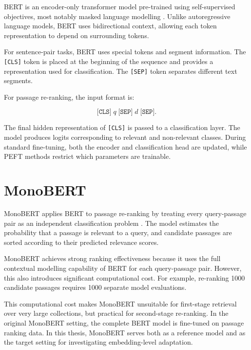 BERT is an encoder-only transformer model pre-trained using self-supervised objectives, most notably masked language modelling \cite{devlin2018bert}. Unlike autoregressive language models, BERT uses bidirectional context, allowing each token representation to depend on surrounding tokens.

For sentence-pair tasks, BERT uses special tokens and segment information. The \texttt{[CLS]} token is placed at the beginning of the sequence and provides a representation used for classification. The \texttt{[SEP]} token separates different text segments.

For passage re-ranking, the input format is:

\begin{equation}
    \texttt{[CLS]} \; q \; \texttt{[SEP]} \; d \; \texttt{[SEP]}.
\end{equation}

The final hidden representation of \texttt{[CLS]} is passed to a classification layer. The model produces logits corresponding to relevant and non-relevant classes. During standard fine-tuning, both the encoder and classification head are updated, while PEFT methods restrict which parameters are trainable.

\section{MonoBERT}
\label{sec:background_monobert}

MonoBERT applies BERT to passage re-ranking by treating every query-passage pair as an independent classification problem \cite{nogueira2019passage}. The model estimates the probability that a passage is relevant to a query, and candidate passages are sorted according to their predicted relevance scores.

MonoBERT achieves strong ranking effectiveness because it uses the full contextual modelling capability of BERT for each query-passage pair. However, this also introduces significant computational cost. For example, re-ranking 1000 candidate passages requires 1000 separate model evaluations.

This computational cost makes MonoBERT unsuitable for first-stage retrieval over very large collections, but practical for second-stage re-ranking. In the original MonoBERT setting, the complete BERT model is fine-tuned on passage ranking data. In this thesis, MonoBERT serves both as a reference model and as the target setting for investigating embedding-level adaptation.

